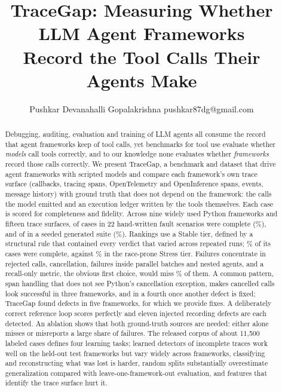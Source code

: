 \documentclass[10pt]{article}
\title{TraceGap: Measuring Whether LLM Agent Frameworks\\Record the Tool Calls Their Agents Make}
\author{\name Pushkar Devanahalli Gopalakrishna \email pushkar87dg@gmail.com}
\begin{document}
\maketitle

\begin{abstract}
Debugging, auditing, evaluation and training of LLM agents all consume the record that agent frameworks keep of tool calls, yet benchmarks for tool use evaluate whether \emph{models} call tools correctly, and to our knowledge none evaluates whether \emph{frameworks} record those calls correctly. We present TraceGap, a benchmark and dataset that drive agent frameworks with scripted models and compare each framework's own trace surface (callbacks, tracing spans, OpenTelemetry and OpenInference spans, events, message history) with ground truth that does not depend on the framework: the calls the model emitted and an execution ledger written by the tools themselves. Each case is scored for completeness and fidelity. Across nine widely used Python frameworks and fifteen trace surfaces, \coreComplete{} of \coreCases{} cases in 22 hand-written fault scenarios were complete (\corePct\%), and \genComplete{} of \genCases{} in a seeded generated suite (\genPct\%). Rankings use a Stable tier, defined by a structural rule that contained every verdict that varied across repeated runs; \stablePct\% of its \stableCases{} cases were complete, against \stressPct\% in the race-prone Stress tier. Failures concentrate in rejected calls, cancellation, failures inside parallel batches and nested agents, and a recall-only metric, the obvious first choice, would miss \ablRecallMissPct\% of them. A common pattern, span handling that does not see Python's cancellation exception, makes cancelled calls look successful in three frameworks, and in a fourth once another defect is fixed; TraceGap found defects in five frameworks, for which we provide fixes. A deliberately correct reference loop scores perfectly and eleven injected recording defects are each detected. An ablation shows that both ground-truth sources are needed: either alone misses or misreports a large share of failures. The released corpus of about 11{,}500 labeled cases defines four learning tasks; learned detectors of incomplete traces work well on the held-out test frameworks but vary widely across frameworks, classifying and reconstructing what was lost is harder, random splits substantially overestimate generalization compared with leave-one-framework-out evaluation, and features that identify the trace surface hurt it.
\end{abstract}
\end{document}
